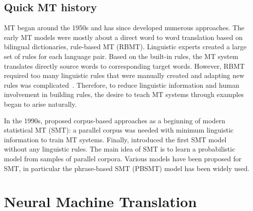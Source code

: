 
\subsection{Quick MT history}

MT began around the 1950s and has since developed numerous approaches. The early MT models were mostly about a direct word to word translation based on bilingual dictionaries, rule-based MT (RBMT). Linguistic experts created a large set of rules for each language pair. Based on the built-in rules, the MT system translates directly source words to corresponding target words. However, RBMT required too many linguistic rules that were manually created and adapting new rules was complicated~\parencite{lagarda-etal-2009-statistical}.
Therefore, to reduce linguistic information and human involvement in building rules, the desire to teach MT systems through examples began to arise naturally.

In the 1990s, \cite{brown-etal-1993-mathematics} proposed corpus-based approaches as a beginning of modern statistical MT (SMT): a parallel corpus was needed with minimum linguistic information to train MT systems. Finally, \cite{berger-etal-1994-candide} introduced the first SMT model without any linguistic rules. The main idea of SMT is to learn a probabilistic model from samples of parallel corpora. Various models have been proposed for SMT, in particular the phrase-based SMT (PBSMT) model \parencite{koehn-etal-2003-statistical} has been widely used.


\section{Neural Machine Translation}\label{section:NMT}

